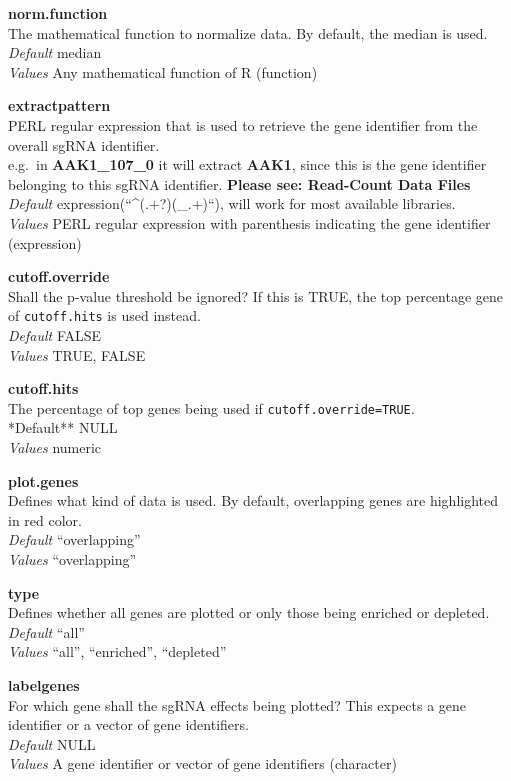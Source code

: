 \documentclass[]{article}
\begin{document}
\textbf{norm.function}\\
The mathematical function to normalize data. By default, the median is
used.\\
\emph{Default} median\\
\emph{Values} Any mathematical function of R (function)

\textbf{extractpattern}\\
PERL regular expression that is used to retrieve the gene identifier
from the overall sgRNA identifier.\\
e.g.~in \textbf{AAK1\_107\_0} it will extract \textbf{AAK1}, since this
is the gene identifier belonging to this sgRNA identifier.
\textbf{Please see: Read-Count Data Files}\\
\emph{Default} expression(``\^{}(.+?)(\_.+)``), will work for most
available libraries.\\
\emph{Values} PERL regular expression with parenthesis indicating the
gene identifier (expression)

\textbf{cutoff.override}\\
Shall the p-value threshold be ignored? If this is TRUE, the top
percentage gene of \texttt{cutoff.hits} is used instead.\\
\emph{Default} FALSE\\
\emph{Values} TRUE, FALSE

\textbf{cutoff.hits}\\
The percentage of top genes being used if
\texttt{cutoff.override=TRUE}.\\
*Default** NULL\\
\emph{Values} numeric

\textbf{plot.genes}\\
Defines what kind of data is used. By default, overlapping genes are
highlighted in red color.\\
\emph{Default} ``overlapping''\\
\emph{Values} ``overlapping''

\textbf{type}\\
Defines whether all genes are plotted or only those being enriched or
depleted.\\
\emph{Default} ``all''\\
\emph{Values} ``all'', ``enriched'', ``depleted''

\textbf{labelgenes}\\
For which gene shall the sgRNA effects being plotted? This expects a
gene identifier or a vector of gene identifiers.\\
\emph{Default} NULL\\
\emph{Values} A gene identifier or vector of gene identifiers
(character)
\end{document}
